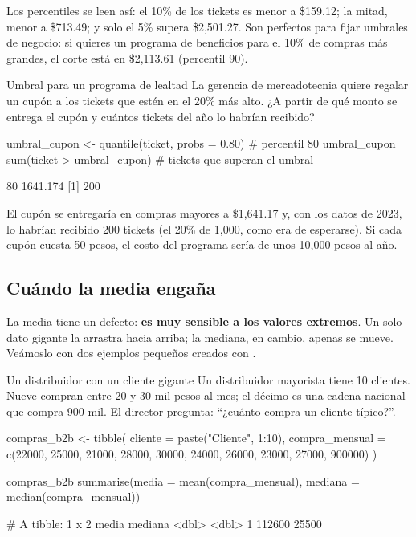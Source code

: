 Los percentiles se leen así: el 10\% de los tickets es menor a \$159.12; la
mitad, menor a \$713.49; y solo el 5\% supera \$2,501.27. Son perfectos para
fijar umbrales de negocio: si quieres un programa de beneficios para el 10\%
de compras más grandes, el corte está en \$2,113.61 (percentil 90).

\begin{ejemplo}{Umbral para un programa de lealtad}
La gerencia de mercadotecnia quiere regalar un cupón a los tickets que estén
en el 20\% más alto. ¿A partir de qué monto se entrega el cupón y cuántos
tickets del año lo habrían recibido?
\end{ejemplo}

\begin{rcode}
umbral_cupon <- quantile(ticket, probs = 0.80)   # percentil 80
umbral_cupon
sum(ticket > umbral_cupon)   # tickets que superan el umbral
\end{rcode}
\begin{rsalida}
     80%
1641.174
[1] 200
\end{rsalida}

El cupón se entregaría en compras mayores a \$1,641.17 y, con los datos de
2023, lo habrían recibido 200 tickets (el 20\% de 1,000, como era de
esperarse). Si cada cupón cuesta 50 pesos, el costo del programa sería de
unos 10,000 pesos al año.

\subsection{Cuándo la media engaña}
\label{sec:m4-media-engana}

La media tiene un defecto: \textbf{es muy sensible a los valores extremos}.
Un solo dato gigante la arrastra hacia arriba; la mediana, en cambio, apenas
se mueve. Veámoslo con dos ejemplos pequeños creados con .

\begin{ejemplo}{Un distribuidor con un cliente gigante}
Un distribuidor mayorista tiene 10 clientes. Nueve compran entre 20 y 30 mil
pesos al mes; el décimo es una cadena nacional que compra 900 mil. El
director pregunta: ``¿cuánto compra un cliente típico?''.
\end{ejemplo}

\begin{rcode}
compras_b2b <- tibble(
  cliente = paste("Cliente", 1:10),
  compra_mensual = c(22000, 25000, 21000, 28000, 30000,
                     24000, 26000, 23000, 27000, 900000)
)

compras_b2b %
  summarise(media   = mean(compra_mensual),
            mediana = median(compra_mensual))
\end{rcode}
\begin{rsalida}
# A tibble: 1 x 2
   media mediana
   <dbl>   <dbl>
1 112600   25500
\end{rsalida}

